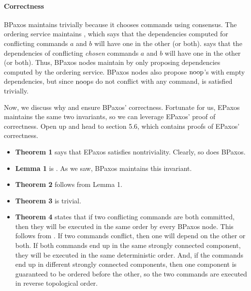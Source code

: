 \paragraph{Correctness}
BPaxos maintains  trivially because it chooses commands
using consensus. The ordering service maintains , which
says that the dependencies computed for conflicting commands $a$ and $b$ will
have one in the other (or both).  says that the
dependencies of conflicting \emph{chosen} commands $a$ and $b$ will have one in
the other (or both). Thus, BPaxos nodes maintain  by
only proposing dependencies computed by the ordering service. BPaxos nodes also
propose $\text{noop}$'s with empty dependencies, but since $\text{noop}$s do not conflict
with any command,  is satisfied trivially.

Now, we discuss why  and 
ensure BPaxos' correctness. Fortunate for us, EPaxos maintains the same two
invariants, so we can leverage EPaxos' proof of correctness. Open up
\cite{moraru2013proof} and head to section 5.6, which contains proofs of
EPaxos' correctness.
\begin{itemize}
  \item
    \textbf{Theorem 1} says that EPaxos satisfies nontriviality. Clearly, so
    does BPaxos.

  \item
    \textbf{Lemma 1} is . As we saw, BPaxos maintains
    this invariant.

  \item
    \textbf{Theorem 2} follows from Lemma 1.

  \item
    \textbf{Theorem 3} is trivial.

  \item
    \textbf{Theorem 4} states that if two conflicting commands are both
    committed, then they will be executed in the same order by every BPaxos
    node. This follows from . If two commands
    conflict, then one will depend on the other or both. If both commands end
    up in the same strongly connected component, they will be executed in the
    same deterministic order. And, if the commands end up in different strongly
    connected components, then one component is guaranteed to be ordered before
    the other, so the two commands are executed in reverse topological order.
\end{itemize}

